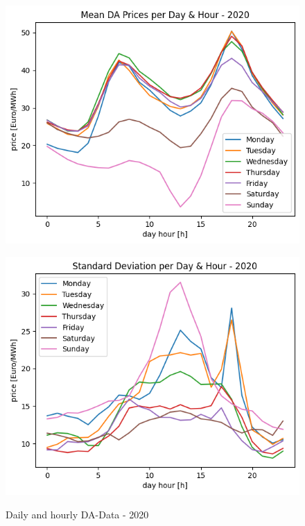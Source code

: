\begin{figure}[h!]
	\centering
	\begin{minipage}{0.49\textwidth}
		\includegraphics[width=1\linewidth]{pictures/DA/Mean DA Prices per Day and Hour - 2020.png}
		\label{fig:meanDA2020}
	\end{minipage} \hfill
	\begin{minipage}{0.49\textwidth}
		\includegraphics[width=1\linewidth]{pictures/DA/Standard Deviation per Day and Hour - 2020.png}
		\label{fig:stdDA2020}
	\end{minipage}
	\caption{Daily and hourly DA-Data - 2020 }
\end{figure}

